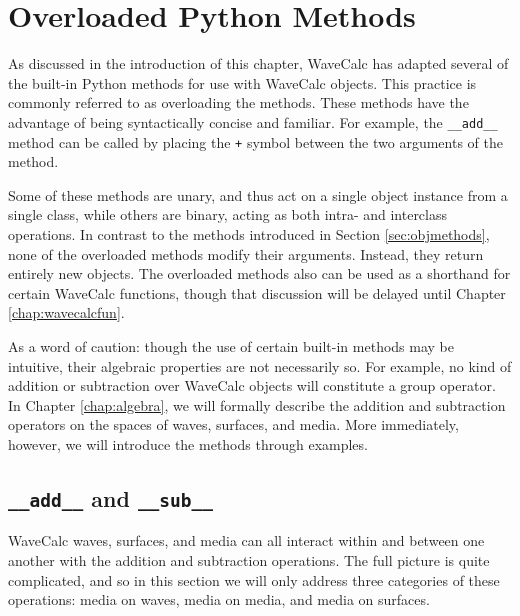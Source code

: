 \documentclass[11pt, reqno]{book}%
\newcounter{ct}
\newcommand{\tw}[1]{{\tt #1}}
\begin{document}
\section{Overloaded Python Methods}
\label{sec:pythmethods}

As discussed in the introduction of this chapter, WaveCalc has adapted several of the built-in Python methods for use with WaveCalc objects. This practice is commonly referred to as overloading the methods. These methods have the advantage of being syntactically concise and familiar. For example, the \tw{\_\_add\_\_} method can be called by placing the \tw{+} symbol between the two arguments of the method. 

Some of these methods are unary, and thus act on a single object instance from a single class, while others are binary, acting as both intra- and interclass operations. In contrast to the methods introduced in Section \ref{sec:objmethods}, none of the overloaded methods modify their arguments. Instead, they return entirely new objects. The overloaded methods also can be used as a shorthand for certain WaveCalc functions, though that discussion will be delayed until Chapter \ref{chap:wavecalcfun}.

As a word of caution: though the use of certain built-in methods may be intuitive, their algebraic properties are not necessarily so. For example, no kind of addition or subtraction over WaveCalc objects will constitute a group operator. In Chapter \ref{chap:algebra}, we will formally describe the addition and subtraction operators on the spaces of waves, surfaces, and media. More immediately, however, we will introduce the methods through examples. 

\subsection{\tw{\_\_add\_\_} and \tw{\_\_sub\_\_}}
\label{sec:plusminusmethods}

WaveCalc waves, surfaces, and media can all interact within and between one another with the addition and subtraction operations. The full picture is quite complicated, and so in this section we will only address three categories of these operations: media on waves, media on media, and media on surfaces. 
\end{document}
